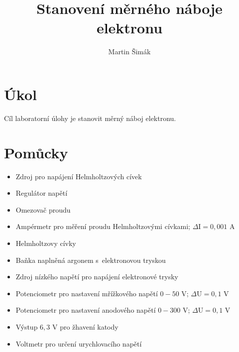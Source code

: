 \documentclass{report}
\title{Stanovení měrného náboje elektronu}
\author{Martin Šimák}
\date{}
\begin{document}
	\maketitle
	\newpage
	
	\section*{Úkol}
		Cíl laboratorní úlohy je stanovit měrný náboj elektronu.
		
	\section*{Pomůcky}
		\begin{itemize}
			\item Zdroj pro napájení Helmholtzových cívek
			\item Regulátor napětí
			\item Omezovač proudu
			\item Ampérmetr pro měření proudu Helmholtzovými cívkami; $\Delta \text{I} = 0,001$ A
			\item Helmholtzovy cívky
			\item Baňka naplněná argonem s elektronovou tryskou
			\item Zdroj nízkého napětí pro napájení elektronové trysky
			\item Potenciometr pro nastavení mřížkového napětí $0-50$ V; $\Delta \text{U} = 0,1$ V %
			\item Potenciometr pro nastavení anodového napětí $0-300$ V; $\Delta \text{U} = 0,1$ V
			\item Výstup $6,3$ V  pro žhavení katody
			\item Voltmetr pro určení urychlovacího napětí
		\end{itemize}
	
\end{document}
